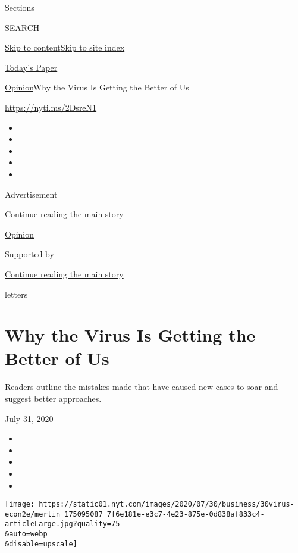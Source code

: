 Sections

SEARCH

\protect\hyperlink{site-content}{Skip to
content}\protect\hyperlink{site-index}{Skip to site index}

\href{https://myaccount.nytimes.com/auth/login?response_type=cookie\&client_id=vi}{}

\href{https://www.nytimes.com/section/todayspaper}{Today's Paper}

\href{/section/opinion}{Opinion}\textbar{}Why the Virus Is Getting the
Better of Us

\url{https://nyti.ms/2DsreN1}

\begin{itemize}
\item
\item
\item
\item
\item
\end{itemize}

Advertisement

\protect\hyperlink{after-top}{Continue reading the main story}

\href{/section/opinion}{Opinion}

Supported by

\protect\hyperlink{after-sponsor}{Continue reading the main story}

letters

\hypertarget{why-the-virus-is-getting-the-better-of-us}{%
\section{Why the Virus Is Getting the Better of
Us}\label{why-the-virus-is-getting-the-better-of-us}}

Readers outline the mistakes made that have caused new cases to soar and
suggest better approaches.

July 31, 2020

\begin{itemize}
\item
\item
\item
\item
\item
\end{itemize}

\texttt{[image: https://static01.nyt.com/images/2020/07/30/business/30virus-econ2e/merlin\_175095087\_7f6e181e-e3c7-4e23-875e-0d838af833c4-articleLarge.jpg?quality=75\\\&auto=webp\\\&disable=upscale]}

